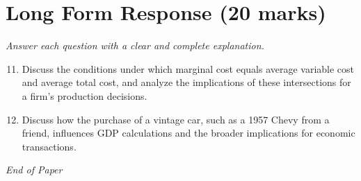 \documentclass[12pt]{article}
\begin{document}
\section*{Long Form Response (20 marks)}
\textit{Answer each question with a clear and complete explanation.}
\begin{enumerate}[label=\arabic*.]
\setcounter{enumi}{10}
\item Discuss the conditions under which marginal cost equals average variable cost and average total cost, and analyze the implications of these intersections for a firm's production decisions.
\item Discuss how the purchase of a vintage car, such as a 1957 Chevy from a friend, influences GDP calculations and the broader implications for economic transactions.
\end{enumerate}

\vfill
\noindent\textit{End of Paper}
\end{document}
